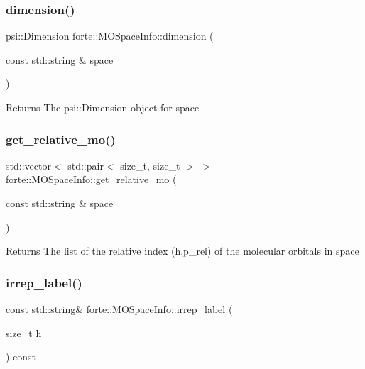 \subsubsection{\texorpdfstring{dimension()}{dimension()}}
{\footnotesize\ttfamily psi\+::\+Dimension forte\+::\+M\+O\+Space\+Info\+::dimension (\begin{DoxyParamCaption}\item[{const std\+::string \&}]{space }\end{DoxyParamCaption})}

\begin{DoxyReturn}{Returns}
The psi\+::\+Dimension object for space 
\end{DoxyReturn}
\mbox{\label{classforte_1_1_m_o_space_info_a46b6bf53859758541d56259c818557d5}} 
\subsubsection{\texorpdfstring{get\+\_\+relative\+\_\+mo()}{get\_relative\_mo()}}
{\footnotesize\ttfamily std\+::vector$<$ std\+::pair$<$ size\+\_\+t, size\+\_\+t $>$ $>$ forte\+::\+M\+O\+Space\+Info\+::get\+\_\+relative\+\_\+mo (\begin{DoxyParamCaption}\item[{const std\+::string \&}]{space }\end{DoxyParamCaption})}

\begin{DoxyReturn}{Returns}
The list of the relative index (h,p\+\_\+rel) of the molecular orbitals in space 
\end{DoxyReturn}
\mbox{\label{classforte_1_1_m_o_space_info_ab5acae63812eb49f7551c892821fb2ab}} 
\subsubsection{\texorpdfstring{irrep\+\_\+label()}{irrep\_label()}}
{\footnotesize\ttfamily const std\+::string\& forte\+::\+M\+O\+Space\+Info\+::irrep\+\_\+label (\begin{DoxyParamCaption}\item[{size\+\_\+t}]{h }\end{DoxyParamCaption}) const\hspace{0.3cm}{\ttfamily [inline]}}

